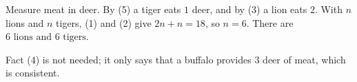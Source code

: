 Measure meat in deer. By (5) a tiger eats $1$ deer, and by (3) a lion eats $2$. With $n$ lions and $n$ tigers, (1) and (2) give $2n+n=18$, so $n=6$. There are $\boxed{6\text{ lions and }6\text{ tigers}}$.

Fact (4) is not needed; it only says that a buffalo provides $3$ deer of meat, which is consistent.
